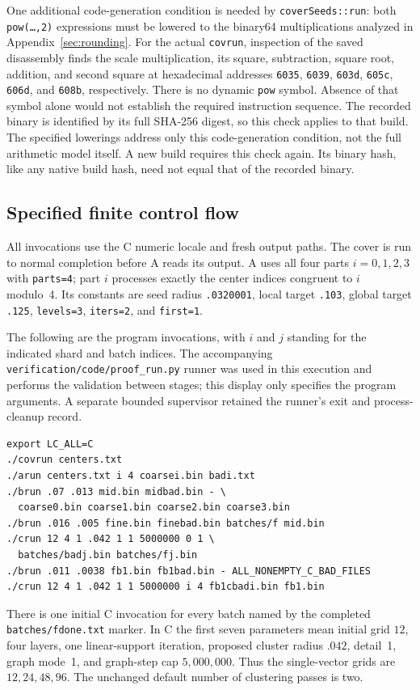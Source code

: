 One additional code-generation condition is needed by
\texttt{coverSeeds::run}: both \texttt{pow(\ldots,2)} expressions must
be lowered to the binary64 multiplications analyzed in
Appendix~\ref{sec:rounding}. For the actual \texttt{covrun}, inspection
of the saved disassembly finds the scale multiplication, its square,
subtraction, square root, addition, and second square at hexadecimal
addresses \texttt{6035}, \texttt{6039}, \texttt{603d},
\texttt{605c}, \texttt{606d}, and \texttt{608b}, respectively. There
is no dynamic \texttt{pow} symbol. Absence of that symbol alone would
not establish the required instruction sequence. The recorded binary is
identified by its full SHA-256 digest, so this check applies to that build.
The specified lowerings address only this code-generation condition, not
the full arithmetic model itself. A new build requires
this check again. Its binary hash, like any native build hash, need not
equal that of the recorded binary.

\subsection{Specified finite control flow}
\label{execute:control}

All invocations use the C numeric locale and fresh output paths.
The cover is run to normal completion before A reads its output.
A uses all four parts $i=0,1,2,3$ with \texttt{parts=4}; part $i$
processes exactly the center indices congruent to $i$ modulo~4.
Its constants are seed radius \texttt{.0320001}, local target
\texttt{.103}, global target \texttt{.125},
\texttt{levels=3}, \texttt{iters=2}, and \texttt{first=1}.

The following are the program invocations, with $i$ and $j$ standing for
the indicated shard and batch indices. The accompanying
\texttt{verification/code/proof\_run.py} runner was used in this execution and
performs the validation between stages; this display only specifies the
program arguments. A separate bounded supervisor retained the runner's
exit and process-cleanup record.
\begin{lstlisting}
export LC_ALL=C
./covrun centers.txt
./arun centers.txt i 4 coarsei.bin badi.txt
./brun .07 .013 mid.bin midbad.bin - \
  coarse0.bin coarse1.bin coarse2.bin coarse3.bin
./brun .016 .005 fine.bin finebad.bin batches/f mid.bin
./crun 12 4 1 .042 1 1 5000000 0 1 \
  batches/badj.bin batches/fj.bin
./brun .011 .0038 fb1.bin fb1bad.bin - ALL_NONEMPTY_C_BAD_FILES
./crun 12 4 1 .042 1 1 5000000 i 4 fb1cbadi.bin fb1.bin
\end{lstlisting}
There is one initial C invocation for every batch named by the completed
\texttt{batches/fdone.txt} marker. In C the first seven parameters mean
initial grid $12$, four layers, one linear-support iteration, proposed
cluster radius $.042$, detail~1, graph mode~1, and graph-step cap
$5{,}000{,}000$. Thus the single-vector grids are $12,24,48,96$.
The unchanged default number of clustering passes is two.


